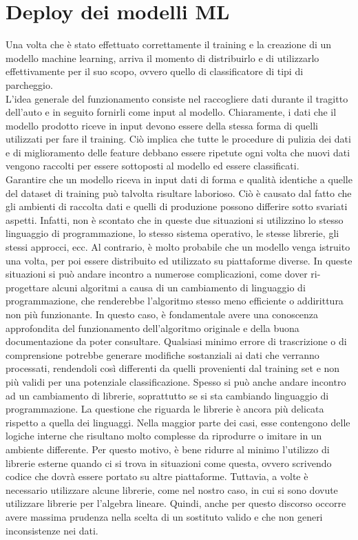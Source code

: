 \chapter{Deploy dei modelli ML}

Una volta che è stato effettuato correttamente il training e la creazione di un modello
machine learning, arriva il momento di distribuirlo e di utilizzarlo effettivamente
per il suo scopo, ovvero quello di classificatore di tipi di parcheggio.\\
L'idea generale del funzionamento consiste nel raccogliere dati durante il tragitto
dell'auto e in seguito fornirli come input al modello. Chiaramente, i dati che 
il modello prodotto riceve in input devono essere della stessa forma di quelli
utilizzati per fare il training. Ciò implica che tutte le procedure di pulizia
dei dati e di miglioramento delle feature debbano essere ripetute ogni volta che
nuovi dati vengono raccolti per essere sottoposti al modello ed essere 
classificati.\\
Garantire che un modello riceva in input dati di forma e qualità identiche a
quelle del dataset di training può talvolta risultare laborioso. Ciò è causato 
dal fatto che gli ambienti di raccolta dati e quelli di produzione possono 
differire sotto svariati aspetti. Infatti, non è scontato che in queste due
situazioni si utilizzino lo stesso linguaggio di programmazione, lo stesso sistema
operativo, le stesse librerie, gli stessi approcci, ecc. Al contrario, è
molto probabile che un modello venga istruito una volta, per poi essere 
distribuito ed utilizzato su piattaforme diverse. In queste situazioni si può
andare incontro a numerose complicazioni, come dover ri-progettare alcuni
algoritmi a causa di un cambiamento di linguaggio di programmazione, che 
renderebbe l'algoritmo stesso meno efficiente o addirittura non più funzionante.
In questo caso, è fondamentale avere una conoscenza approfondita del funzionamento
dell'algoritmo originale e della buona documentazione da poter consultare. 
Qualsiasi minimo errore di trascrizione o di comprensione potrebbe generare
modifiche sostanziali ai dati che verranno processati, rendendoli così differenti
da quelli provenienti dal training set e non più validi per una potenziale
classificazione. Spesso si può anche andare incontro ad un cambiamento di librerie,
soprattutto se si sta cambiando linguaggio di programmazione. La questione che
riguarda le librerie è ancora più delicata rispetto a quella dei linguaggi. Nella
maggior parte dei casi, esse contengono delle logiche interne che risultano molto
complesse da riprodurre o imitare in un ambiente differente. Per questo motivo,
è bene ridurre al minimo l'utilizzo di librerie esterne quando ci si trova in 
situazioni come questa, ovvero scrivendo codice che dovrà essere portato su altre
piattaforme. Tuttavia, a volte è necessario utilizzare alcune librerie, come nel
nostro caso, in cui si sono dovute utilizzare librerie per l'algebra lineare.
Quindi, anche per questo discorso occorre avere massima prudenza nella scelta di
un sostituto valido e che non generi inconsistenze nei dati.

